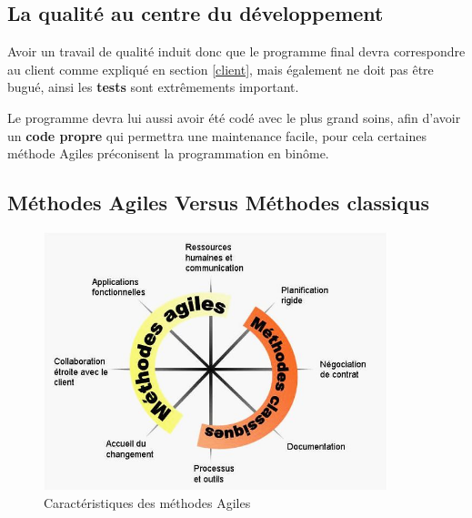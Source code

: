 		\subsection{La qualité au centre du développement}
		Avoir un travail de qualité induit donc que le programme final devra correspondre au client comme expliqué en section \ref{client}, mais également ne doit pas être bugué, ainsi
		les \textbf{tests} sont extrêmements important.

		Le programme devra lui aussi avoir été codé avec le plus grand soins, afin d'avoir un \textbf{code propre} qui permettra une maintenance facile, pour cela certaines méthode Agiles préconisent la programmation en binôme.
		\subsection{Méthodes Agiles Versus Méthodes classiqus}
		\begin{figure}[H]
			\center
			\includegraphics[width=10cm]{images/1-caracAgiles.jpg}
			\caption{Caractéristiques des méthodes Agiles}
		\end{figure}
		
